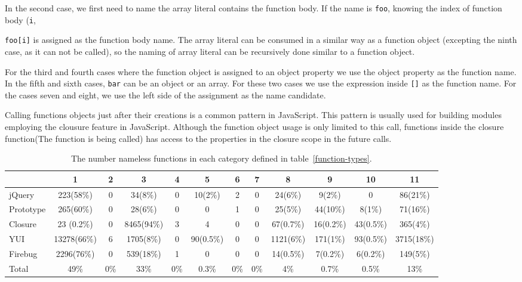 \documentclass{acm_proc_article-sp}
\begin{document}
In the second case, we first need to name the array literal contains the function body. If the name is {\small\texttt{foo}}, knowing the index of function body ({\small\texttt{i}}, {{\small\texttt{foo[i]}} is assigned as the function body name. The array literal can be consumed in a similar way as a function object (excepting the ninth case, as it can not be called), so the naming of array literal can be recursively done similar to a function object.

For the third and fourth cases where the function object is assigned to an object property we use the object property as the function name. In the fifth and sixth cases, {\small\texttt{bar}} can be an object or an array. For these two cases we use the expression inside {\small\texttt{[]}} as the function name. For the cases seven and eight, we use the left side of the assignment as the name candidate.

Calling functions objects just after their creations is a common pattern in JavaScript. This pattern is usually used for building modules employing the clousure feature in JavaScript. Although the function object usage is only limited to this call, functions inside the closure function(The function is being called) has access to the properties in the closure scope in the future calls. 
 

\begin{table}
\centering
\caption{The number nameless functions in each category defined in table~\ref{function-types}.}
  \begin{tabular}{ | l | c | c | c | c | c | c | c | c | c | c | c |}
  \hline
     & 1 & 2 & 3 & 4 & 5 & 6 & 7 & 8 & 9 & 10 & 11 \\ 
  \hline 
   jQuery & 223(58\%) & 0  & 34(8\%) & 0 & 10(2\%) & 2 & 0 & 24(6\%) & 9(2\%) & 0 & 86(21\%)  \\ 
  \hline 
   Prototype & 265(60\%) & 0 & 28(6\%)& 0 & 0 & 1& 0 & 25(5\%)& 44(10\%)& 8(1\%) & 71(16\%) \\ 
  \hline 
   Closure & 23 (0.2\%)& 0 & 8465(94\%)& 3 & 4 & 0 & 0 & 67(0.7\%)& 16(0.2\%)& 43(0.5\%)& 365(4\%)\\ 
  \hline 
   YUI & 13278(66\%)& 6 & 1705(8\%)& 0 & 90(0.5\%)& 0 & 0 & 1121(6\%)& 171(1\%)& 93(0.5\%)& 3715(18\%)\\ 
  \hline 
   Firebug & 2296(76\%)& 0 & 539(18\%)& 1 & 0 & 0 & 0 & 14(0.5\%)& 7(0.2\%)& 6(0.2\%)& 149(5\%) \\ 
  \hline 
   Total & 49\%& 0\% & 33\% & 0\% & 0.3\% & 0\% & 0\% & 4\%& 0.7\%& 0.5\%& 13\% \\ 
  \hline 
  \end{tabular}
 \label{functions-types-count} 
\end{table}    



}
\end{document}
